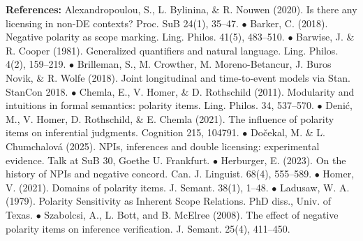 \documentclass[12pt,a4paper]{article}
\begin{document}
\vspace{+1mm}
\noindent \small \textbf{References:} Alexandropoulou, S., L. Bylinina, \& R. Nouwen (2020). Is there any licensing in non-DE contexts? Proc. SuB 24(1), 35–47. $\bullet$ Barker, C. (2018). Negative polarity as scope marking. Ling. Philos. 41(5), 483–510. $\bullet$ Barwise, J. \& R. Cooper (1981). Generalized quantifiers and natural language. Ling. Philos. 4(2), 159–219. $\bullet$
Brilleman, S., M. Crowther, M. Moreno-Betancur, J. Buros Novik, \& R. Wolfe (2018). Joint longitudinal and time-to-event models via Stan. StanCon 2018. $\bullet$
Chemla, E., V. Homer, \& D. Rothschild (2011). Modularity and intuitions in formal semantics: polarity items. Ling. Philos. 34, 537–570. $\bullet$
Denić, M., V. Homer, D. Rothschild, \& E. Chemla (2021). The influence of polarity items on inferential judgments. Cognition 215, 104791. $\bullet$
Dočekal, M. \& L. Chumchalová (2025). NPIs, inferences and double licensing: experimental evidence. Talk at SuB 30, Goethe U. Frankfurt. $\bullet$
Herburger, E. (2023). On the history of NPIs and negative concord. Can. J. Linguist. 68(4), 555–589. $\bullet$ 
Homer, V. (2021). Domains of polarity items. J. Semant. 38(1), 1–48. $\bullet$ 
Ladusaw, W. A. (1979). Polarity Sensitivity as Inherent Scope Relations. PhD diss., Univ. of Texas. $\bullet$
Szabolcsi, A., L. Bott, and B. McElree (2008). The effect of negative polarity items on inference verification. J. Semant. 25(4), 411–450.
\end{document}

